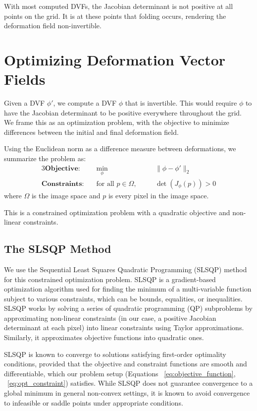 \documentclass[lettersize,journal]{IEEEtran}
\begin{document}
With most computed DVFs, the Jacobian determinant is not positive at all points on the grid. It is at these points that folding occurs, rendering the deformation field non-invertible.

\section{Optimizing Deformation Vector Fields}
Given a DVF $\phi'$, we compute a DVF $\phi$ that is invertible. This would require $\phi$ to have the Jacobian determinant to be positive everywhere throughout the grid. We frame this as an optimization problem, with the objective to minimize differences between the initial and final deformation field. 

Using the Euclidean norm as a difference measure between deformations, we summarize the problem as:
\begin{alignat}{3}
\textbf{Objective:} \quad & \min_{\phi} && \quad \|\phi - \phi'\|_2 \label{eq:objective_function} \\
\textbf{Constraints:} \quad & \text{for all } p \in \Omega, && \quad \det(J_{\phi}(p)) > 0 \label{eq:opt_constraint}
\end{alignat}
where $\Omega$ is the image space and $p$ is every pixel in the image space.

This is a constrained optimization problem with a quadratic objective and non-linear constraints.

\subsection{The SLSQP Method}

We use the Sequential Least Squares Quadratic Programming (SLSQP) method \cite{Kraft_1988, SciPySLSQPDoc} for this constrained optimization problem. SLSQP is a gradient-based optimization algorithm used for finding the minimum of a multi-variable function subject to various constraints, which can be bounds, equalities, or inequalities. SLSQP works by solving a series of quadratic programming (QP) subproblems by approximating non-linear constraints (in our case, a positive Jacobian determinant at each pixel) into linear constraints using Taylor approximations. Similarly, it approximates objective functions into quadratic ones. 

SLSQP is known to converge to solutions satisfying first-order optimality conditions, provided that the objective and constraint functions are smooth and differentiable, which our problem setup (Equations ~\ref{eq:objective_function},  ~\ref{eq:opt_constraint}) satisfies. While SLSQP does not guarantee convergence to a global minimum in general non-convex settings, it is known to avoid convergence to infeasible or saddle points under appropriate conditions.
\end{document}
